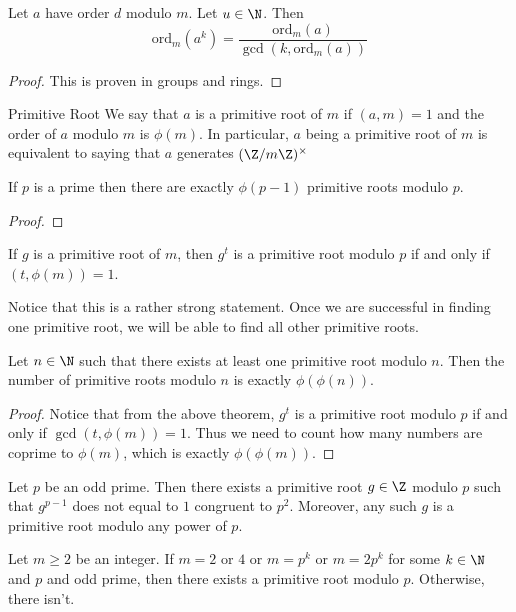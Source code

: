 \documentclass[a4paper]{article}
\begin{document}
\begin{thm}{}{} Let $a$ have order $d$ modulo $m$. Let $u\in\N$. Then $$\text{ord}_m(a^k)=\frac{\text{ord}_m(a)}{\gcd(k,\text{ord}_m(a))}$$\tcbline
\begin{proof}
This is proven in groups and rings. 
\end{proof}
\end{thm}

\begin{defn}{Primitive Root}{} We say that $a$ is a primitive root of $m$ if $(a,m)=1$ and the order of $a$ modulo $m$ is $\phi(m)$. In particular, $a$ being a primitive root of $m$ is equivalent to saying that $a$ generates $(\Z/m\Z)^{\times}$
\end{defn}

\begin{crl}{}{} If $p$ is a prime then there are exactly $\phi(p-1)$ primitive roots modulo $p$. \tcbline
\begin{proof}
\end{proof}
\end{crl}

\begin{thm}{}{} If $g$ is a primitive root of $m$, then $g^t$ is a primitive root modulo $p$ if and only if $(t,\phi(m))=1$. 
\end{thm}

Notice that this is a rather strong statement. Once we are successful in finding one primitive root, we will be able to find all other primitive roots. 

\begin{prp}{}{} Let $n\in\N$ such that there exists at least one primitive root modulo $n$. Then the number of primitive roots modulo $n$ is exactly $\phi(\phi(n))$. \tcbline
\begin{proof}
Notice that from the above theorem, $g^t$ is a primitive root modulo $p$ if and only if $\gcd(t,\phi(m))=1$. Thus we need to count how many numbers are coprime to $\phi(m)$, which is exactly $\phi(\phi(m))$. 
\end{proof}
\end{prp}

\begin{thm}{}{} Let $p$ be an odd prime. Then there exists a primitive root $g\in\Z$ modulo $p$ such that $g^{p-1}$ does not equal to $1$ congruent to $p^2$. Moreover, any such $g$ is a primitive root modulo any power of $p$. 
\end{thm}

\begin{thm}{}{} Let $m\geq 2$ be an integer. If $m=2$ or $4$ or $m=p^k$ or $m=2p^k$ for some $k\in\N$ and $p$ and odd prime, then there exists a primitive root modulo $p$. Otherwise, there isn't. 
\end{thm}
\end{document}

